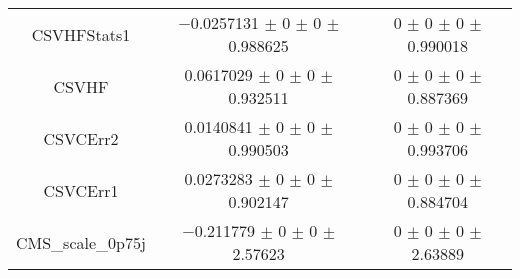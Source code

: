 \begin{table}
\begin{tabular}{ccc}
CSVHFStats1 	& \num{-0.0257131} $\pm$ \num{0} $\pm$ \num{0} $\pm$ \num{0.988625} 	& \num{0} $\pm$ \num{0} $\pm$ \num{0} $\pm$ \num{0.990018}\\
CSVHF 	& \num{0.0617029} $\pm$ \num{0} $\pm$ \num{0} $\pm$ \num{0.932511} 	& \num{0} $\pm$ \num{0} $\pm$ \num{0} $\pm$ \num{0.887369}\\
CSVCErr2 	& \num{0.0140841} $\pm$ \num{0} $\pm$ \num{0} $\pm$ \num{0.990503} 	& \num{0} $\pm$ \num{0} $\pm$ \num{0} $\pm$ \num{0.993706}\\
CSVCErr1 	& \num{0.0273283} $\pm$ \num{0} $\pm$ \num{0} $\pm$ \num{0.902147} 	& \num{0} $\pm$ \num{0} $\pm$ \num{0} $\pm$ \num{0.884704}\\
CMS\_scale\_0p75j 	& \num{-0.211779} $\pm$ \num{0} $\pm$ \num{0} $\pm$ \num{2.57623} 	& \num{0} $\pm$ \num{0} $\pm$ \num{0} $\pm$ \num{2.63889}\\
\bottomrule
\end{tabular}
\end{table}